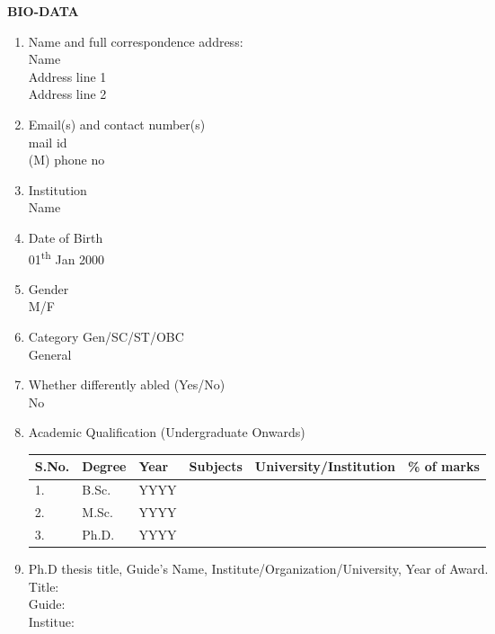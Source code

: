 \documentclass[12pt,a4paper]{article}
\begin{document}
\begin{center}
	\textbf{BIO-DATA}
\end{center}


\begin{enumerate}
 	\item	Name and full correspondence address: \\
 			Name  \\
 			Address line 1 \\
 			Address line 2
 			
 	\item 	Email(s) and contact number(s) \\
 			mail id	\\
 			(M) phone no
 		
 	\item 	Institution \\
 	      	Name\\ 
 	      	
 	\item 	Date of Birth \\
 			01\textsuperscript{th} Jan 2000
 			
 	\item	Gender  \\
 			M/F
 			
 	\item 	Category Gen/SC/ST/OBC \\
 			General
 	
 	\item 	Whether differently abled (Yes/No)\\
 			No

	\item  	Academic Qualification (Undergraduate Onwards)\\
			\begin{tabular}{|p{1cm}|p{1.25cm}|p{1.25cm}|p{3.5cm}|p{4cm}|p{2cm}|}
				\hline
				S.No. 	&Degree		&Year		&Subjects	& University/Institution		& \% of marks \\
				\hline
				1.	&B.Sc.		&YYYY		& 			& 								& \\
				2. 	&M.Sc.		&YYYY		& 			& 								& \\
				3.	&Ph.D.		&YYYY		& 			& 								&\\
				\hline
			\end{tabular}	 		
 	
 	\item 	Ph.D thesis title, Guide's Name, Institute/Organization/University, Year of Award. \\
 			Title:  \\
			Guide:  \\
			Institue:  
			

\end{enumerate}
\end{document}
